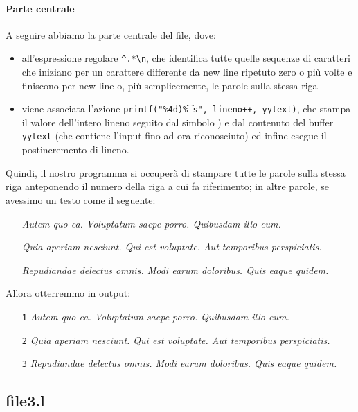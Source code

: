 \documentclass[class=book, crop=false, oneside, 12pt]{standalone}
\begin{document}
\paragraph{Parte centrale}
A seguire abbiamo la parte centrale del file, dove: 

\begin{itemize}
    \item all'espressione regolare \texttt{\^{}.*\textbackslash n}, che identifica tutte quelle sequenze di caratteri che iniziano per un carattere differente da new line ripetuto zero o più volte e finiscono per new line o, più semplicemente, le parole sulla stessa riga
    \item  viene associata l'azione \texttt{printf("\%4d)\t\%s", lineno++, yytext)}, che stampa il valore dell'intero lineno seguito dal simbolo ) e dal contenuto del buffer \texttt{yytext} (che contiene l'input fino ad ora riconosciuto) ed infine esegue il postincremento di lineno.
\end{itemize}

\noindent Quindi, il nostro programma si occuperà di stampare tutte le parole sulla stessa riga anteponendo il numero della riga a cui fa riferimento; in altre parole, se avessimo un testo come il seguente:
\begin{itemize}[noitemsep]
    \item[] \emph{Autem quo ea. Voluptatum saepe porro. Quibusdam illo eum.}
    \item[] \emph{Quia aperiam nesciunt. Qui est voluptate. Aut temporibus perspiciatis.}
    \item[] \emph{Repudiandae delectus omnis. Modi earum doloribus. Quis eaque quidem.}
\end{itemize}
Allora otterremmo in output:
\begin{enumerate}[noitemsep]
    \item[\texttt{1}] \emph{Autem quo ea. Voluptatum saepe porro. Quibusdam illo eum.}
    \item[\texttt{2}] \emph{Quia aperiam nesciunt. Qui est voluptate. Aut temporibus perspiciatis.}
    \item[\texttt{3}] \emph{Repudiandae delectus omnis. Modi earum doloribus. Quis eaque quidem.}
\end{enumerate}


\subsection*{file3.l}
\end{document}
